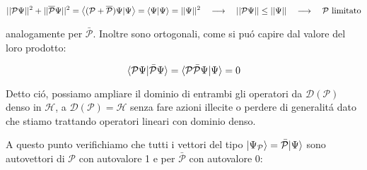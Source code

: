 $$||{\cal P}\Psi||^{2}+||\overline{{\cal P}}\Psi||^{2}=\left\langle({\cal P}+\overline{{\cal P}})\Psi|\Psi\right\rangle=\left\langle\Psi|\Psi\right\rangle=||\Psi||^{2}\quad\longrightarrow\quad||{\cal P}\Psi||\leq||\Psi||\quad\longrightarrow\quad\mathcal{P}\text{ limitato}$$

analogamente per $\bar{\mathcal{P}}$. Inoltre sono ortogonali, come si pu\'o capire dal valore del loro prodotto:

$$\normalsize\langle \mathcal{P}\Psi \normalsize| \bar{\mathcal{P}}\Psi \normalsize\rangle = \normalsize\langle \mathcal{P}\bar{\mathcal{P}}\Psi \normalsize| \Psi \normalsize\rangle = 0$$

Detto ci\'o, possiamo ampliare il dominio di entrambi gli operatori da $\mathcal{D}(\mathcal{P})$ denso in $\mathcal{H}$, a $\mathcal{D}(\mathcal{P}) = \mathcal{H}$ senza fare azioni illecite o perdere di generalit\'a dato che stiamo trattando operatori lineari con dominio denso.

A questo punto verifichiamo che tutti i vettori del tipo $\normalsize| \Psi_{\mathcal{P}} \normalsize\rangle = \bar{\mathcal{P}} \normalsize| \Psi \normalsize\rangle$ sono autovettori di $\mathcal{P}$ con autovalore 1 e per $\bar{\mathcal{P}}$ con autovalore 0:

